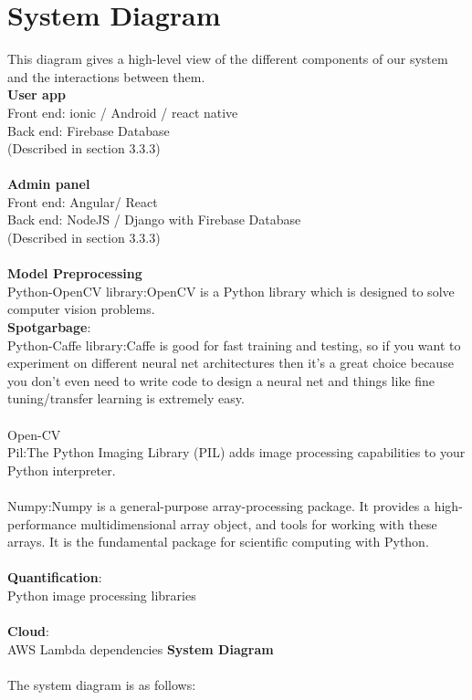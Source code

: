 \section{System Diagram}
This diagram gives a high-level view of the different components of our system and the interactions between them.\\
\textbf{User  app}\\
Front end: ionic / Android / react native\\
Back end: Firebase Database\\
(Described in section 3.3.3)\\
\\
\textbf{Admin panel}\\
Front end: Angular/ React\\
Back end: NodeJS / Django with Firebase Database\\
(Described in section 3.3.3)\\
\\
\textbf{Model Preprocessing}\\
Python-OpenCV library:OpenCV is a Python library which is designed to solve computer vision problems.
\\
\textbf{Spotgarbage}:\\
Python-Caffe library:Caffe is good for fast training and testing, so if you want to experiment on different neural net architectures then it's a great choice because you don't even need to write code to design a neural net and things like fine tuning/transfer learning is extremely easy.\\
\\
Open-CV
\\
Pil:The Python Imaging Library (PIL) adds image processing capabilities to your Python interpreter.\\
\\
Numpy:Numpy is a general-purpose array-processing package. It provides a high-performance multidimensional array object, and tools for working with these arrays. It is the fundamental package for scientific computing with Python.\\
\\
\textbf{Quantification}: \\
Python image processing libraries\\
\\
\textbf{Cloud}:\\
AWS Lambda dependencies
\newpage
\textbf{System Diagram}\\
\\
The system diagram is as follows:
